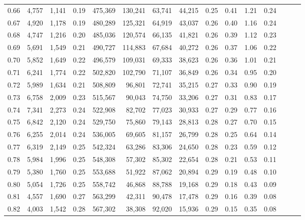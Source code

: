 \begin{tabular}{rrrrrrrrrrrrrrr}
0.66 &   4,757 &  1,141 &  0.19 &  475,369 &  130,241 &   63,741 &   44,215 &  0.25 &  0.41 &  1.21 &      0.24 \\
0.67 &   4,920 &  1,178 &  0.19 &  480,289 &  125,321 &   64,919 &   43,037 &  0.26 &  0.40 &  1.16 &      0.24 \\
0.68 &   4,747 &  1,216 &  0.20 &  485,036 &  120,574 &   66,135 &   41,821 &  0.26 &  0.39 &  1.12 &      0.23 \\
0.69 &   5,691 &  1,549 &  0.21 &  490,727 &  114,883 &   67,684 &   40,272 &  0.26 &  0.37 &  1.06 &      0.22 \\
0.70 &   5,852 &  1,649 &  0.22 &  496,579 &  109,031 &   69,333 &   38,623 &  0.26 &  0.36 &  1.01 &      0.21 \\
0.71 &   6,241 &  1,774 &  0.22 &  502,820 &  102,790 &   71,107 &   36,849 &  0.26 &  0.34 &  0.95 &      0.20 \\
0.72 &   5,989 &  1,634 &  0.21 &  508,809 &   96,801 &   72,741 &   35,215 &  0.27 &  0.33 &  0.90 &      0.19 \\
0.73 &   6,758 &  2,009 &  0.23 &  515,567 &   90,043 &   74,750 &   33,206 &  0.27 &  0.31 &  0.83 &      0.17 \\
0.74 &   7,341 &  2,273 &  0.24 &  522,908 &   82,702 &   77,023 &   30,933 &  0.27 &  0.29 &  0.77 &      0.16 \\
0.75 &   6,842 &  2,120 &  0.24 &  529,750 &   75,860 &   79,143 &   28,813 &  0.28 &  0.27 &  0.70 &      0.15 \\
0.76 &   6,255 &  2,014 &  0.24 &  536,005 &   69,605 &   81,157 &   26,799 &  0.28 &  0.25 &  0.64 &      0.14 \\
0.77 &   6,319 &  2,149 &  0.25 &  542,324 &   63,286 &   83,306 &   24,650 &  0.28 &  0.23 &  0.59 &      0.12 \\
0.78 &   5,984 &  1,996 &  0.25 &  548,308 &   57,302 &   85,302 &   22,654 &  0.28 &  0.21 &  0.53 &      0.11 \\
0.79 &   5,380 &  1,760 &  0.25 &  553,688 &   51,922 &   87,062 &   20,894 &  0.29 &  0.19 &  0.48 &      0.10 \\
0.80 &   5,054 &  1,726 &  0.25 &  558,742 &   46,868 &   88,788 &   19,168 &  0.29 &  0.18 &  0.43 &      0.09 \\
0.81 &   4,557 &  1,690 &  0.27 &  563,299 &   42,311 &   90,478 &   17,478 &  0.29 &  0.16 &  0.39 &      0.08 \\
0.82 &   4,003 &  1,542 &  0.28 &  567,302 &   38,308 &   92,020 &   15,936 &  0.29 &  0.15 &  0.35 &      0.08 \\

\end{tabular}
